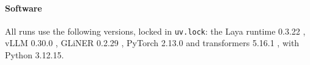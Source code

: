 \paragraph{Software} All runs use the following versions, locked in \texttt{uv.lock}: the Laya runtime 0.3.22 \citep{laya2026}, vLLM 0.30.0 \citep{kwon2023vllm}, GLiNER 0.2.29 \citep{zaratiana2024gliner}, PyTorch 2.13.0 \citep{paszke2019pytorch} and transformers 5.16.1 \citep{wolf2020transformers}, with Python 3.12.15.
